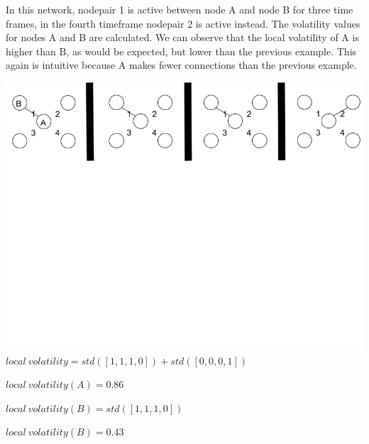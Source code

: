 \documentclass[oneside,12pt]{Classes/RoboticsLaTeX}
\begin{document}
\begin{appendices}
In this network, nodepair 1 is active between node A and node B for three time frames, in the fourth timeframe nodepair 2 is active instead. The volatility values for nodes A and B are calculated. We can observe that the local volatility of A is higher than B, as would be expected, but lower than the previous example. This again is intuitive because A makes fewer connections than the previous example.
\begin{center}
\includegraphics[trim={0 15cm 0 0}, width=140mm]{./Figures/volatilityAppendix2.png}
$local\ volatility = std([1,1,1,0]) + std([0,0,0,1])$

$local\ volatility(A) = 0.86$

$local\ volatility(B) = std([1,1,1,0])$

$local\ volatility(B) = 0.43$
\end{center}


\end{appendices}
\end{document}
